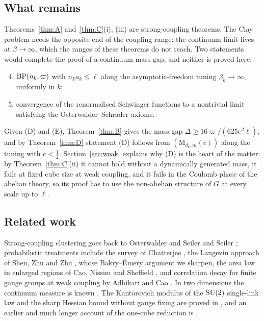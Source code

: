 \subsection{What remains}

Theorems~\ref{thm:A} and~\ref{thm:C}(i), (iii) are strong-coupling theorems.
The Clay problem needs the opposite end of the coupling range: the continuum
limit lives at $\beta\to\infty$, which the ranges of these theorems do not
reach. Two
statements would complete the proof of a continuum mass gap, and neither is
proved here:
\begin{enumerate}[label=\textup{(\Alph*)},leftmargin=*]
\setcounter{enumi}{3}
\item $\mathrm{BP}(n_k,\varpi)$ with $n_ka_k\le\ell$ along the asymptotic-freedom
tuning $\beta_k\to\infty$, uniformly in $k$;
\item convergence of the renormalised Schwinger functions to a nontrivial
limit satisfying the Osterwalder--Schrader axioms.
\end{enumerate}
Given (D) and (E), Theorem~\ref{thm:B} gives the mass gap $\Delta\ge
16\varpi/(625e^2\ell)$, and by Theorem~\ref{thm:D} statement (D) follows from
$(\mathrm M_{d_k,m}(c))$ along the tuning with $c<\frac12$. Section~\ref{sec:weak} explains why (D) is the heart of
the matter: by Theorem~\ref{thm:C}(ii) it cannot hold without a dynamically
generated mass, it fails at fixed cube size at weak coupling, and it fails in
the Coulomb phase of the abelian theory, so its proof has to use the
non-abelian structure of $G$ at every scale up to $\ell$.

\subsection{Related work}

Strong-coupling clustering goes back to Osterwalder and Seiler \cite{OSei78}
and Seiler \cite{Sei82}; probabilistic treatments include the survey of
Chatterjee \cite{Chat19}, the Langevin approach of Shen, Zhu and Zhu
\cite{SZZ23}, whose Bakry--\'Emery argument we sharpen, the area law in
enlarged regions of Cao, Nissim and Sheffield \cite{CNS25}, and correlation
decay for finite gauge groups at weak coupling by Adhikari and Cao \cite{AC25}.
In two dimensions the continuum measure is known
\cite{GKS89,Dri89,Lev03}. The Kantorovich modulus of the $\mathrm{SU}(2)$ single-link
law and the sharp Hessian bound without gauge fixing are proved in
\cite{BB26a}, and an earlier and much longer account of the one-cube
reduction is \cite{BBLR26}.

